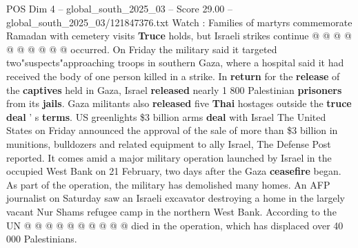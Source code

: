 \begin{textsample}{POS Dim 4 – global\_south\_2025\_03 – Score 29.00 – global\_south\_2025\_03/121847376.txt}
Watch : Families of martyrs commemorate Ramadan with cemetery visits \textbf{Truce} holds, but Israeli strikes continue @ @ @ @ @ @ @ @ @ @ occurred.
On Friday the military said it targeted two"suspects"approaching troops in southern Gaza, where a hospital said it had received the body of one person killed in a strike.
In \textbf{return} for the \textbf{release} of the \textbf{captives} held in Gaza, Israel \textbf{released} nearly 1 800 Palestinian \textbf{prisoners} from its \textbf{jails}.
Gaza militants also \textbf{released} five \textbf{Thai} hostages outside the \textbf{truce} \textbf{deal} ' s \textbf{terms}.
US greenlights \$3 billion arms \textbf{deal} with Israel The United States on Friday announced the approval of the sale of more than \$3 billion in munitions, bulldozers and related equipment to ally Israel, The Defense Post reported.
It comes amid a major military operation launched by Israel in the occupied West Bank on 21 February, two days after the Gaza \textbf{ceasefire} began.
As part of the operation, the military has demolished many homes.
An AFP journalist on Saturday saw an Israeli excavator destroying a home in the largely vacant Nur Shams refugee camp in the northern West Bank.
According to the UN @ @ @ @ @ @ @ @ @ @ died in the operation, which has displaced over 40 000 Palestinians.

\end{textsample}

